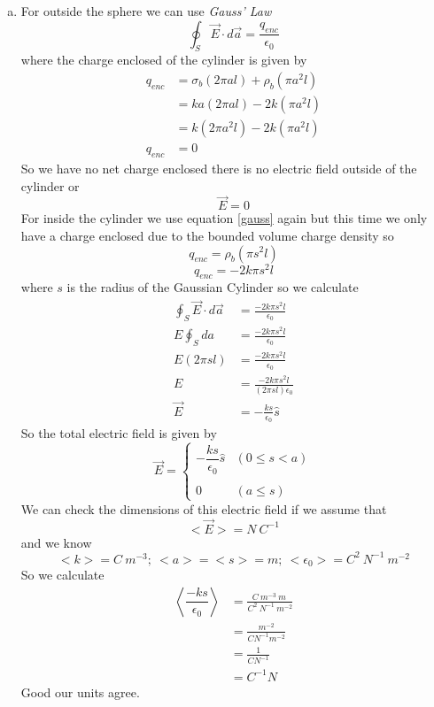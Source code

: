 \documentclass[11pt]{article}
\numberwithin{equation}{section}
\newcommand{\vecE}{\vec{E}}
\begin{document}
\begin{enumerate}[(a)]
\item
For outside the sphere we can use \emph{Gauss' Law}
\begin{equation}
\oint_S \vecE\cdot d\vec{a} = \frac{q_{enc}}{\epsilon_0}
\label{gauss}
\end{equation}
where the charge enclosed of the cylinder is given by 
\begin{align*}
q_{enc} &= \sigma_b (2\pi al)+\rho_b (\pi a^2l)\\
&= ka(2\pi al)-2k(\pi a^2l)\\
&= k(2\pi a^2l)-2k(\pi a^2l)\\
q_{enc} &= 0
\end{align*}
So we have no net charge enclosed there is no electric field outside of the cylinder or 
$$\vecE = 0$$
For inside the cylinder we use equation \ref{gauss} again but this time we only have a charge enclosed due to the bounded volume charge density so
$$q_{enc} = \rho_b(\pi s^2l)$$
$$q_{enc} = -2k\pi s^2l$$
where $s$ is the radius of the Gaussian Cylinder so we calculate
\begin{align*}
\oint_S \vecE\cdot d\vec{a} &= \frac{-2k\pi s^2l}{\epsilon_0}\\
E\oint_Sda &= \frac{-2k\pi s^2l}{\epsilon_0}\\
E(2\pi sl)&= \frac{-2k\pi s^2l}{\epsilon_0}\\
E&= \frac{-2k\pi s^2l}{(2\pi sl)\epsilon_0}\\
\vecE&= -\frac{ks}{\epsilon_0}\hat{s}
\end{align*}
So the total electric field is given by
$$\vecE = \left\{\begin{array}{cc}
	-\dfrac{ks}{\epsilon_0}\hat{s} 	&(0\le s<a)\\
\\
	0 &(a\le s)
	\end{array}\right.$$
We can check the dimensions of this electric field if we assume that
$$<\vecE> = N\ C^{-1}$$
and we know
$$<k> = C\ m^{-3};\ <a>=<s>=m;\ <\epsilon_0> = C^2\ N^{-1}\ m^{-2}$$
So we calculate
\begin{align*}
\left<\dfrac{-ks}{\epsilon_0}\right> &= \frac{C\ m^{-3}\ m\ }{C^2\ N^{-1}\ m^{-2}}\\
&= \frac{m^{-2}}{C N^{-1} m^{-2}}\\
&= \frac{1}{C N^{-1}}\\
&= C^{-1} N
\end{align*}
Good our units agree.


\end{enumerate}
\end{document}
